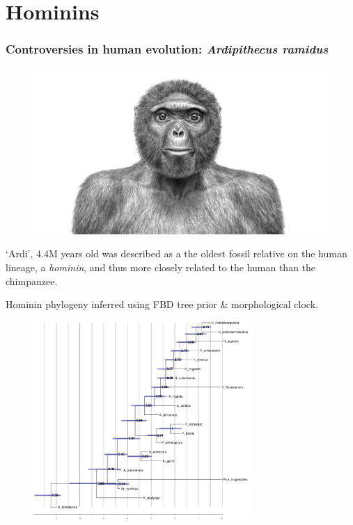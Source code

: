 \section{Hominins}

\begin{frame}
\frametitle{Controversies in human evolution: {\it Ardipithecus ramidus}}
\begin{figure}
\includegraphics[width=\textwidth]{ardi_crop.jpg}
\end{figure}
`Ardi', 4.4M years old was described as a the oldest fossil relative on the human lineage, a {\it hominin}, and thus more closely related to the human than the chimpanzee. 
\end{frame}

\begin{frame}{Hominin phylogeny inferred using FBD tree prior \& morphological clock.}
\begin{figure}
\includegraphics[width=0.75\textwidth]{homininSummaryTree.pdf}
\end{figure}
\end{frame}
